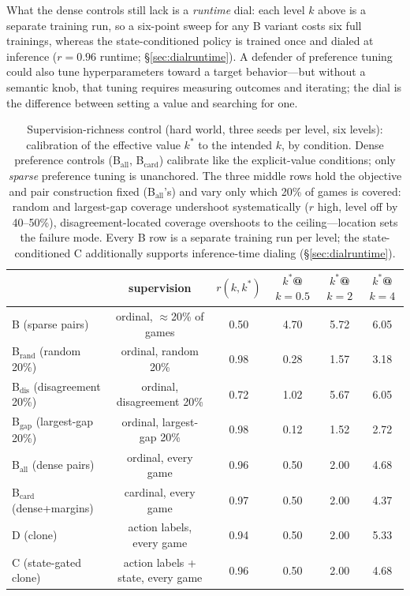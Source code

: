 \documentclass[11pt]{article}
\begin{document}
What the dense controls still lack is a \emph{runtime} dial: each level $k$ above is a separate
training run, so a six-point sweep for any B variant costs six full trainings, whereas the
state-conditioned policy is trained once and dialed at inference ($r{=}0.96$ runtime;
\S\ref{sec:dialruntime}). A defender of preference tuning could also tune hyperparameters
toward a target behavior---but without a semantic knob, that tuning requires measuring outcomes
and iterating; the dial is the difference between setting a value and searching for one.

\begin{table}[t]
\centering
\caption{Supervision-richness control (hard world, three seeds per level, six levels):
calibration of the effective value $k^*$ to the intended $k$, by condition. Dense preference
controls (B$_{\mathrm{all}}$, B$_{\mathrm{card}}$) calibrate like the explicit-value
conditions; only \emph{sparse} preference tuning is unanchored. The three middle rows hold the
objective and pair construction fixed (B$_{\mathrm{all}}$'s) and vary only which 20\% of games
is covered: random and largest-gap coverage undershoot systematically ($r$ high, level off by
40--50\%), disagreement-located coverage overshoots to the ceiling---location sets the failure
mode. Every B row is a separate training run per level; the state-conditioned C additionally
supports inference-time dialing (\S\ref{sec:dialruntime}).}
\label{tab:dialrich}
\small
\setlength{\tabcolsep}{5pt}
\begin{tabular}{l c c c c c}
\toprule
 & supervision & $r(k, k^*)$ & $k^*$@$k{=}0.5$ & $k^*$@$k{=}2$ & $k^*$@$k{=}4$ \\
\midrule
B (sparse pairs) & ordinal, $\approx$20\% of games & 0.50 & 4.70 & 5.72 & 6.05 \\
\midrule
B$_{\mathrm{rand}}$ (random 20\%) & ordinal, random 20\% & 0.98 & 0.28 & 1.57 & 3.18 \\
B$_{\mathrm{dis}}$ (disagreement 20\%) & ordinal, disagreement 20\% & 0.72 & 1.02 & 5.67 & 6.05 \\
B$_{\mathrm{gap}}$ (largest-gap 20\%) & ordinal, largest-gap 20\% & 0.98 & 0.12 & 1.52 & 2.72 \\
\midrule
B$_{\mathrm{all}}$ (dense pairs) & ordinal, every game & 0.96 & 0.50 & 2.00 & 4.68 \\
B$_{\mathrm{card}}$ (dense+margins) & cardinal, every game & 0.97 & 0.50 & 2.00 & 4.37 \\
D (clone) & action labels, every game & 0.94 & 0.50 & 2.00 & 5.33 \\
C (state-gated clone) & action labels + state, every game & 0.96 & 0.50 & 2.00 & 4.68 \\
\bottomrule
\end{tabular}
\end{table}
\end{document}
